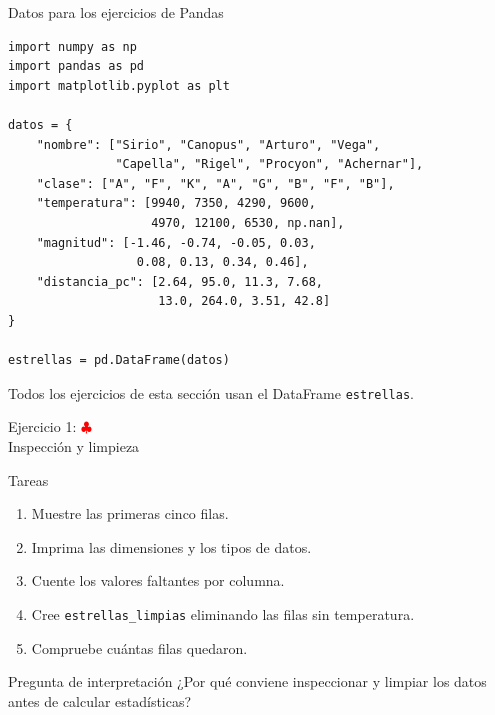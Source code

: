 \documentclass[10pt]{beamer}
\begin{document}
\begin{frame}[fragile]{Datos para los ejercicios de Pandas}
\begin{verbatim}
import numpy as np
import pandas as pd
import matplotlib.pyplot as plt

datos = {
    "nombre": ["Sirio", "Canopus", "Arturo", "Vega",
               "Capella", "Rigel", "Procyon", "Achernar"],
    "clase": ["A", "F", "K", "A", "G", "B", "F", "B"],
    "temperatura": [9940, 7350, 4290, 9600,
                    4970, 12100, 6530, np.nan],
    "magnitud": [-1.46, -0.74, -0.05, 0.03,
                  0.08, 0.13, 0.34, 0.46],
    "distancia_pc": [2.64, 95.0, 11.3, 7.68,
                     13.0, 264.0, 3.51, 42.8]
}

estrellas = pd.DataFrame(datos)
\end{verbatim}

  Todos los ejercicios de esta sección usan el DataFrame \texttt{estrellas}.
\end{frame}

\begin{frame}{Ejercicio 1: \hfill \textcolor{red}{$\clubsuit$} \\ Inspección y limpieza}
  \begin{block}{Tareas}
    \begin{enumerate}
      \item Muestre las primeras cinco filas.
      \item Imprima las dimensiones y los tipos de datos.
      \item Cuente los valores faltantes por columna.
      \item Cree \texttt{estrellas\_limpias} eliminando las filas sin temperatura.
      \item Compruebe cuántas filas quedaron.
    \end{enumerate}
  \end{block}

  \begin{alertblock}{Pregunta de interpretación}
    ¿Por qué conviene inspeccionar y limpiar los datos antes de calcular estadísticas?
  \end{alertblock}
\end{frame}
\end{document}
